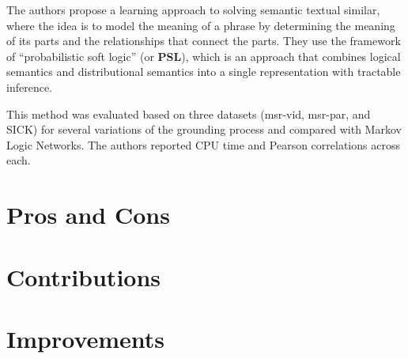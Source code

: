 \documentclass[letterpaper]{article}
\begin{document}
The authors propose a learning approach to solving semantic textual similar, where the idea is to model the meaning of a phrase by determining the meaning of its parts and the relationships that connect the parts. They use the framework of ``probabilistic soft logic'' (or \textbf{PSL}), which is an approach that combines logical semantics and distributional semantics into a single representation with tractable inference.

This method was evaluated based on three datasets (msr-vid, msr-par, and SICK) for several variations of the grounding process and compared with Markov Logic Networks. The authors reported CPU time and Pearson correlations across each.

\section{Pros and Cons}



\section{Contributions}

\section{Improvements}
\end{document}

